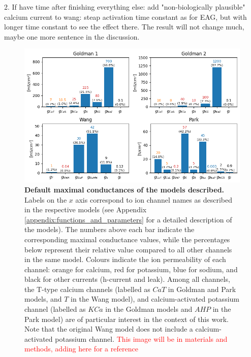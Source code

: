 \documentclass[../main.tex]{subfiles}
\begin{document}
\color{red}



2. If have time after finishing everything else: add "non-biologically plausible" calcium current to wang: steap activation time constant as for EAG, but with longer time constant to see the effect there. The result will not change much, maybe one more sentence in the discussion.

\color{black}

\newpage
\begin{figure}[H]
    \centering
    \includegraphics[width=\linewidth]{../img/materials_and_methods/model_conductances.png}
    \caption[Default maximal conductances of the models described]{
        \textbf{Default maximal conductances of the models described.} Labels on the $x$ axis correspond to ion channel names as described in the respective models (see Appendix \ref{appendix:functions_and_parameters} for a detailed description of the models).
        The numbers above each bar indicate the corresponding maximal conductance values, while the percentages below represent their relative value compared to all other channels in the same model.
        Colours indicate the ion permeability of each channel: orange for calcium, red for potassium, blue for sodium, and black for other currents (h-current and leak).
        Among all channels, the T-type calcium channels (labelled as $CaT$ in Goldman and Park models, and $T$ in the Wang model), and calcium-activated potassium channel (labelled as $KCa$ in the Goldman models and $AHP$ in the Park model) are of particular interest in the context of this work. Note that the original Wang model does not include a calcium-activated potassium channel. \textcolor{red}{This image will be in materials and methods, adding here for a reference}
    }
    \label{fig:model_conductances}
\end{figure}
    
\end{document}

